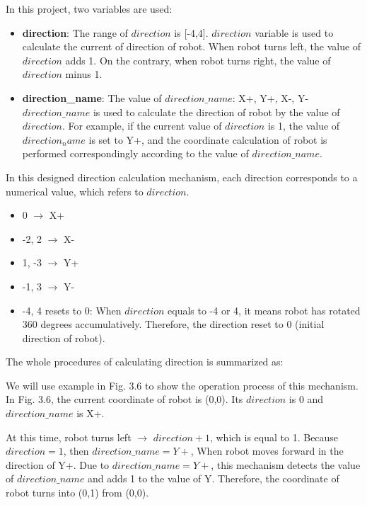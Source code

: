 \documentclass[11pt,times,oneside,openright,hardcopy]{eeereport}
\begin{document}
In this project, two variables are used:
\begin{itemize}
    \item \textbf{direction}: The range of $direction$ is [-4,4]. \newline $direction$ variable is used to calculate the current of direction of robot. When robot turns left, the value of $direction$ adds 1. On the contrary, when robot turns right, the value of $direction$ minus 1.
    \item \textbf{direction\_name}: The value of $direction\_name$: X+, Y+, X-, Y- \newline $direction\_name$ is used to calculate the direction of robot by the value of $direction$. For example, if the current value of $direction$ is 1, the value of $direction_name$ is set to Y+, and the coordinate calculation of robot is performed correspondingly according to the value of $direction\_name$.

\end{itemize}

In this designed direction calculation mechanism, each direction corresponds to a numerical value, which refers to $direction$.
\begin{itemize}
    \item 0 $\rightarrow$ X+
    \item -2, 2 $\rightarrow$ X-
    \item 1, -3 $\rightarrow$ Y+
    \item -1, 3 $\rightarrow$ Y-
    \item -4, 4 resets to 0: \newline When $direction$ equals to -4 or 4, it means robot has rotated 360 degrees accumulatively. Therefore, the direction reset to 0 (initial direction of robot).
\end{itemize}

The whole procedures of calculating direction is summarized as:

We will use example in Fig. 3.6 to show the operation process of this mechanism.
In Fig. 3.6, the current coordinate of robot is (0,0). Its $direction$ is 0 and $direction\_name$ is X+.

At this time, robot turns left $\rightarrow$ $direction + 1$, which is equal to 1. Because $direction = 1$, then $direction\_name = Y+$,
When robot moves forward in the direction of Y+. Due to $direction\_name = Y+$, this mechanism detects the value of $direction\_name$ and adds 1 to the value of Y.
Therefore, the coordinate of robot turns into (0,1) from (0,0).
\end{document}
